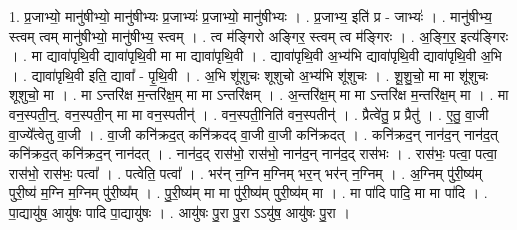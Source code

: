 \documentclass[17pt]{extarticle}
\begin{document}
1. प्र॒जाभ्यो॒ मानु॑षीभ्यो॒ मानु॑षीभ्यः प्र॒जाभ्यः॑ प्र॒जाभ्यो॒ मानु॑षीभ्यः । . प्र॒जाभ्य॒ इति॑ प्र - जाभ्यः॑ । . मानु॑षीभ्य॒ स्त्वम् त्वम् मानु॑षीभ्यो॒ मानु॑षीभ्य॒ स्त्वम् । . त्व म॑ङ्गिरो अङ्गिर॒ स्त्वम् त्व म॑ङ्गिरः । . अ॒ङ्गि॒र॒ इत्य॑ङ्गिरः । . मा द्यावा॑पृथि॒वी द्यावा॑पृथि॒वी मा मा द्यावा॑पृथि॒वी । . द्यावा॑पृथि॒वी अ॒भ्य॑भि द्यावा॑पृथि॒वी द्यावा॑पृथि॒वी अ॒भि । . द्यावा॑पृथि॒वी इति॒ द्यावा᳚ - पृ॒थि॒वी । . अ॒भि शू॑शुचः शूशुचो अ॒भ्य॑भि शू॑शुचः । . शू॒शु॒चो॒ मा मा शू॑शुचः शूशुचो॒ मा । . मा ऽन्तरि॑क्ष म॒न्तरि॑क्ष॒म् मा मा ऽन्तरि॑क्षम् । . अ॒न्तरि॑क्ष॒म् मा मा ऽन्तरि॑क्ष म॒न्तरि॑क्ष॒म् मा । . मा वन॒स्पती॒न्॒. वन॒स्पती॒न् मा मा वन॒स्पतीन्॑ । . वन॒स्पती॒निति॑ वन॒स्पतीन्॑ । . प्रैत्वे॑तु॒ प्र प्रैतु॑ । . ए॒तु॒ वा॒जी वा॒ज्ये᳚त्वेतु वा॒जी । . वा॒जी कनि॑क्रद॒त् कनि॑क्रदद् वा॒जी वा॒जी कनि॑क्रदत् । . कनि॑क्रद॒न् नान॑द॒न् नान॑द॒त् कनि॑क्रद॒त् कनि॑क्रद॒न् नान॑दत् । . नान॑द॒द् रास॑भो॒ रास॑भो॒ नान॑द॒न् नान॑द॒द् रास॑भः । . रास॑भः॒ पत्वा॒ पत्वा॒ रास॑भो॒ रास॑भः॒ पत्वा᳚ । . पत्वेति॒ पत्वा᳚ । . भर॑न् न॒ग्नि म॒ग्निम् भर॒न् भर॑न् न॒ग्निम् । . अ॒ग्निम् पु॑री॒ष्य॑म् पुरी॒ष्य॑ म॒ग्नि म॒ग्निम् पु॑री॒ष्य᳚म् । . पु॒री॒ष्य॑म् मा मा पु॑री॒ष्य॑म् पुरी॒ष्य॑म् मा । . मा पा॑दि पादि॒ मा मा पा॑दि । . पा॒द्यायु॑ष॒ आयु॑षः पादि पा॒द्यायु॑षः । . आयु॑षः पु॒रा पु॒रा ऽऽयु॑ष॒ आयु॑षः पु॒रा । \newline
\end{document}
